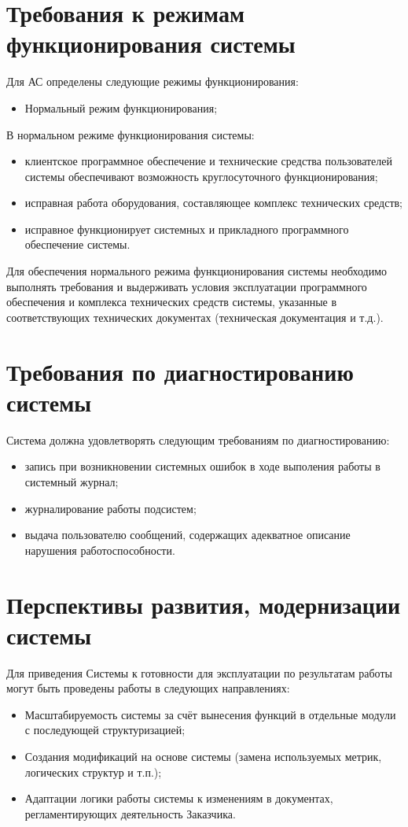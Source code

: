 \section{Требования к режимам функционирования системы}
Для АС определены следующие режимы функционирования:
\begin{itemize}
    \item Нормальный режим функционирования;
\end{itemize}
В нормальном режиме функционирования системы:
\begin{itemize}
    \item клиентское программное обеспечение и технические средства пользователей системы 
        обеспечивают возможность круглосуточного функционирования;
    \item исправная работа оборудования, составляющее комплекс технических средств;
    \item исправное функционирует системных и прикладного программного обеспечение системы.
\end{itemize}
Для обеспечения нормального режима функционирования системы необходимо выполнять требования и 
выдерживать условия эксплуатации программного обеспечения и комплекса технических средств системы, 
указанные в соответствующих технических документах (техническая документация и т.д.).

\section{Требования по диагностированию системы}
Система должна удовлетворять следующим требованиям по диагностированию:
\begin{itemize}
    \item запись при возникновении системных ошибок в ходе выполения работы в системный журнал;
    \item журналирование работы подсистем;
    \item выдача пользователю сообщений, содержащих адекватное описание нарушения 
        работоспособности.
\end{itemize}

\section{Перспективы развития, модернизации системы}
Для приведения Системы к готовности для эксплуатации по результатам работы могут быть 
проведены работы в следующих направлениях:
\begin{itemize}
    \item Масштабируемость системы за счёт вынесения функций в отдельные модули с 
        последующей структуризацией;
    \item Создания модификаций на основе системы (замена используемых метрик, логических 
        структур и т.п.);
    \item Адаптации логики работы системы к изменениям в документах, регламентирующих 
        деятельность Заказчика.
\end{itemize}

